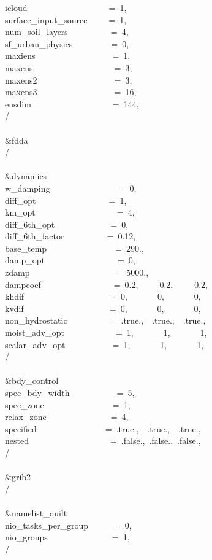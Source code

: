 icloud~~~~~~~~~~~~~~~~~~~=~1,\\
surface\_input\_source~~~~~=~1,\\
num\_soil\_layers~~~~~~~~~~=~4,\\
sf\_urban\_physics~~~~~~~~~=~0,~~\\
maxiens~~~~~~~~~~~~~~~~~~=~1,\\
maxens~~~~~~~~~~~~~~~~~~~=~3,\\
maxens2~~~~~~~~~~~~~~~~~~=~3,\\
maxens3~~~~~~~~~~~~~~~~~~=~16,\\
ensdim~~~~~~~~~~~~~~~~~~~=~144,\\
/\\
\\
\&fdda~~~~~~~~~~~~~~~~~~~~\\
/\\
\\
\&dynamics~~~~~~~~~~~~~~~~\\
w\_damping~~~~~~~~~~~~~~~~=~0,\\
diff\_opt~~~~~~~~~~~~~~~~~=~1,\\
km\_opt~~~~~~~~~~~~~~~~~~~=~4,\\
diff\_6th\_opt~~~~~~~~~~~~~=~0,~~~~~~~~\\
diff\_6th\_factor~~~~~~~~~~=~0.12,~~~~~\\
base\_temp~~~~~~~~~~~~~~~~=~290.,\\
damp\_opt~~~~~~~~~~~~~~~~~=~0,\\
zdamp~~~~~~~~~~~~~~~~~~~~=~5000.,~~~~\\
dampcoef~~~~~~~~~~~~~~~~~=~0.2,~~~~~0.2,~~~~~0.2,~~~~~~~~\\
khdif~~~~~~~~~~~~~~~~~~~~=~0,~~~~~~~0,~~~~~~~0,~~~~~~~~~~\\
kvdif~~~~~~~~~~~~~~~~~~~~=~0,~~~~~~~0,~~~~~~~0,~~~~~~~~~~\\
non\_hydrostatic~~~~~~~~~~=~.true.,~~.true.,~~.true.,~~~~~\\
moist\_adv\_opt~~~~~~~~~~~~=~1,~~~~~~~1,~~~~~~~1,~~~~~~~~~~\\
scalar\_adv\_opt~~~~~~~~~~~=~1,~~~~~~~1,~~~~~~~1,~~~~~~~~~~\\
/\\
\\
\&bdy\_control~~~~~~~~~~~~~\\
spec\_bdy\_width~~~~~~~~~~~=~5,\\
spec\_zone~~~~~~~~~~~~~~~~=~1,\\
relax\_zone~~~~~~~~~~~~~~~=~4,\\
specified~~~~~~~~~~~~~~~~=~.true.,~~.true.,~~.true.,~~\\
nested~~~~~~~~~~~~~~~~~~~=~.false.,~.false.,~.false.,~~\\
/\\
\\
\&grib2~~~~~~~~~~~~~~~~~~~\\
/\\
\\
\&namelist\_quilt~~~~~~~~~~\\
nio\_tasks\_per\_group~~~~~~=~0,\\
nio\_groups~~~~~~~~~~~~~~~=~1,\\
/\\



